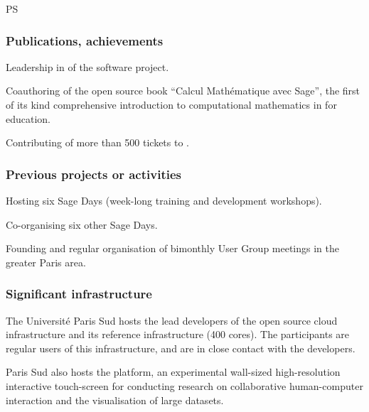 \begin{sitedescription}{PS}
\subsubsection*{Publications, achievements}

\begin{compactenum}
\item Leadership in of the \SageCombinat software project.
\item Coauthoring of the open source book ``Calcul Mathématique avec
  Sage'', the first of its kind comprehensive introduction to
  computational mathematics in \Sage for education.
\item Contributing of more than 500 tickets to \Sage.
\end{compactenum}


\subsubsection*{Previous projects or activities}

\begin{compactenum}
\item Hosting six Sage Days (week-long training and development workshops).
\item Co-organising six other Sage Days.
\item Founding and regular organisation of bimonthly \Sage User Group
  meetings in the greater Paris area.
\end{compactenum}

\subsubsection*{Significant infrastructure}

The Université Paris Sud hosts the lead developers of the open source
cloud infrastructure  and its reference
infrastructure (400 cores). The participants are regular users
of this infrastructure, and are in close contact with the developers.

Paris Sud also hosts the  platform, an experimental wall-sized
high-resolution interactive touch-screen for conducting research on
collaborative human-computer interaction and the visualisation of
large datasets.

\end{sitedescription}



